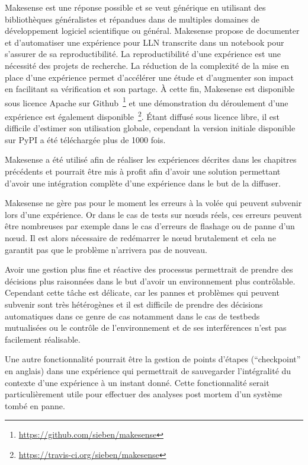 Makesense est une réponse possible et se veut générique en utilisant des bibliothèques généralistes et répandues dans de multiples domaines de développement logiciel scientifique ou général.
Makesense propose de documenter et d'automatiser une expérience pour \ac{LLN} transcrite dans un notebook pour s'assurer de sa reproductibilité.
La reproductibilité d'une expérience est une nécessité des projets de recherche.
La réduction de la complexité de la mise en place d'une expérience permet d’accélérer une étude et d'augmenter son impact en facilitant sa vérification et son partage.
À cette fin, Makesense est disponible sous licence Apache sur Github~\footnote{\href{https://github.com/sieben/makesense}{https://github.com/sieben/makesense}} et une démonstration du déroulement d'une expérience est également disponible~\footnote{\href{https://travis-ci.org/sieben/makesense}{https://travis-ci.org/sieben/makesense}}.
Étant diffusé sous licence libre, il est difficile d'estimer son utilisation globale, cependant la version initiale disponible sur PyPI a été téléchargée plus de 1000 fois.

Makesense a été utilisé afin de réaliser les expériences décrites dans les chapitres précédents et pourrait être mis à profit afin d'avoir une solution permettant d'avoir une intégration complète d'une expérience dans le but de la diffuser.

Makesense ne gère pas pour le moment les erreurs à la volée qui peuvent subvenir lors d'une expérience.
Or dans le cas de tests sur nœuds réels, ces erreurs peuvent être nombreuses par exemple dans le cas d'erreurs de flashage ou de panne d'un nœud.
Il est alors nécessaire de redémarrer le nœud brutalement et cela ne garantit pas que le problème n'arrivera pas de nouveau.

Avoir une gestion plus fine et réactive des processus permettrait de prendre des décisions plus raisonnées dans le but d'avoir un environnement plus contrôlable.
Cependant cette tâche est délicate, car les pannes et problèmes qui peuvent subvenir sont très hétérogènes et il est difficile de prendre des décisions automatiques dans ce genre de cas notamment dans le cas de testbeds mutualisées ou le contrôle de l'environnement et de ses interférences n'est pas facilement réalisable.

Une autre fonctionnalité pourrait être la gestion de points d'étapes (``checkpoint'' en anglais) dans une expérience qui permettrait de sauvegarder l'intégralité du contexte d'une expérience à un instant donné.
Cette fonctionnalité serait particulièrement utile pour effectuer des analyses post mortem d'un système tombé en panne.

